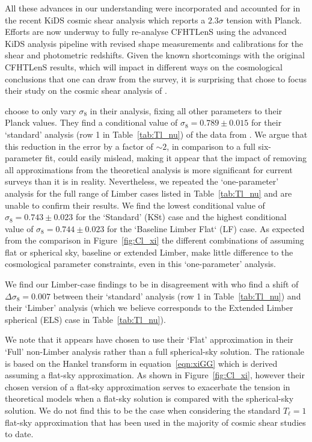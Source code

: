 All these advances in our understanding were incorporated and accounted for in the recent KiDS cosmic shear analysis \citep{hildebrandt/etal:2016} which reports a $2.3 \sigma$ tension with Planck.  Efforts are now underway to fully re-analyse CFHTLenS using the advanced KiDS analysis pipeline with revised shape measurements and calibrations for the shear and photometric redshifts.  Given the known shortcomings with the original CFHTLenS results, which will impact in different ways on the cosmological conclusions that one can draw from the survey, it is surprising that \citet{kitching/etal:2016} chose to focus their study on the cosmic shear analysis of \citet{kilbinger/etal:2013}.  

\citet{kitching/etal:2016} choose to only vary $\sigma_8$ in their analysis, fixing all other parameters to their Planck values. They find a conditional value of $\sigma_8 = 0.789 \pm 0.015$ for their `standard' analysis (row 1 in Table~\ref{tab:Tl_nu}) of the data from \citet{kilbinger/etal:2013}.    We argue that this reduction in the error by a factor of $\sim 2$, in comparison to a full six-parameter fit, could easily mislead, making it appear that the impact of removing all approximations from the theoretical analysis is more significant for current surveys than it is in reality.  Nevertheless, we repeated the `one-parameter' analysis for the full range of Limber cases listed in Table~\ref{tab:Tl_nu} and are unable to confirm their results.  We find the lowest conditional value of $\sigma_8 = 0.743 \pm 0.023$ for the `Standard' (KSt) case and the highest conditional value of $\sigma_8 = 0.744 \pm 0.023$ for the `Baseline Limber Flat` (LF) case.  As expected from the comparison in Figure~\ref{fig:Cl_xi} the different combinations of assuming flat or spherical sky, baseline or extended Limber, make little difference to the cosmological parameter constraints, even in this `one-parameter' analysis.    

We find our Limber-case findings to be in disagreement with \citet{kitching/etal:2016} who find a shift of $\Delta \sigma_8 = 0.007$ between their `standard' analysis (row 1 in Table~\ref{tab:Tl_nu}) and their `Limber' analysis (which we believe corresponds to the Extended Limber spherical (ELS) case in Table~\ref{tab:Tl_nu}).  

We note that it appears \citet{kitching/etal:2016} have chosen to use their `Flat' approximation in their `Full' non-Limber analysis rather than a full spherical-sky solution.  The rationale is based on the Hankel transform in equation~\ref{eqn:xiGG} which is derived assuming a flat-sky approximation.  As shown in Figure~\ref{fig:Cl_xi}, however their chosen version of a flat-sky approximation serves to exacerbate the tension in theoretical models when a flat-sky solution is compared with the spherical-sky solution. We do not find this to be the case when considering the standard $T_\ell = 1$ flat-sky approximation that has been used in the majority of cosmic shear studies to date.

